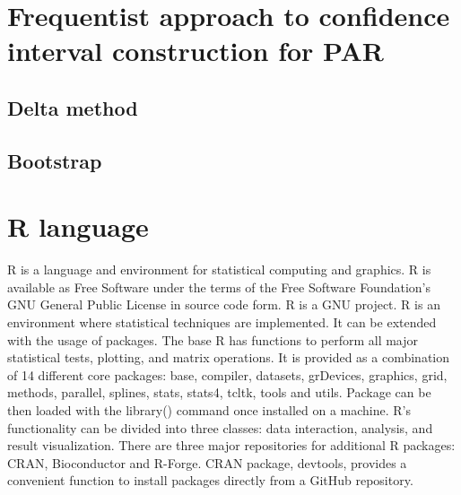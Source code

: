 \section{Frequentist approach to confidence interval construction for PAR}\label{FrequentistApproach}
\subsection{Delta method}\label{DeltaMethod}

\subsection{Bootstrap}\label{Bootstrap}

\section{R language}\label{Rlanguage}
R is a language and environment for statistical computing and graphics. R is available as Free Software under the terms of the Free Software Foundation's GNU General Public License in source code form. R is a GNU project. R is an environment where statistical techniques are implemented. It can be extended with the usage of packages. \cite{RWebPage} The base R has functions to perform all major statistical tests, plotting, and matrix operations. It is provided as a combination of 14 different core packages: base, compiler, datasets, grDevices, graphics, grid, methods, parallel, splines, stats, stats4, tcltk, tools and utils. Package can be then loaded with the library() command once installed on a machine. R's functionality can be divided into three classes: data interaction, analysis, and result visualization. There are three major repositories for additional R packages: CRAN, Bioconductor and R-Forge. CRAN package, devtools, provides a convenient function to install packages directly from a GitHub repository. \cite{Giorgi2022TheRL}
